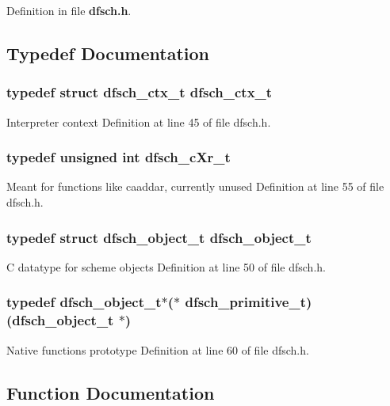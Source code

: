 Definition in file {\bf dfsch.h}.

\subsection{Typedef Documentation}
\subsubsection{\setlength{\rightskip}{0pt plus 5cm}typedef struct {\bf dfsch\_\-ctx\_\-t} {\bf dfsch\_\-ctx\_\-t}}\label{dfsch_8h_a2}


Interpreter context Definition at line 45 of file dfsch.h.
\subsubsection{\setlength{\rightskip}{0pt plus 5cm}typedef unsigned int {\bf dfsch\_\-c\-Xr\_\-t}}\label{dfsch_8h_a4}


Meant for functions like caaddar, currently unused Definition at line 55 of file dfsch.h.
\subsubsection{\setlength{\rightskip}{0pt plus 5cm}typedef struct {\bf dfsch\_\-object\_\-t} {\bf dfsch\_\-object\_\-t}}\label{dfsch_8h_a3}


C datatype for scheme objects Definition at line 50 of file dfsch.h.
\subsubsection{\setlength{\rightskip}{0pt plus 5cm}typedef {\bf dfsch\_\-object\_\-t}$\ast$($\ast$ {\bf dfsch\_\-primitive\_\-t})({\bf dfsch\_\-object\_\-t} $\ast$)}\label{dfsch_8h_a5}


Native functions prototype Definition at line 60 of file dfsch.h.

\subsection{Function Documentation}
